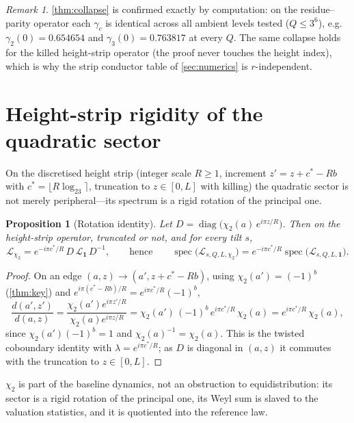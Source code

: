 \documentclass[11pt]{article}
\newcommand{\Lcal}{\mathcal{L}}
\theoremstyle{plain}
\newtheorem{proposition}{Proposition}
\theoremstyle{definition}
\theoremstyle{remark}
\newtheorem*{remark}{Remark}
\begin{document}
\begin{remark}
\cref{thm:collapse} is confirmed exactly by computation: on the residue--parity
operator each $\gamma_c$ is identical across all ambient levels tested
($Q\le3^6$), e.g.\ $\gamma_2(0)=0.654654$ and $\gamma_3(0)=0.763817$ at every
$Q$. The same collapse holds for the killed height-strip operator (the proof
never touches the height index), which is why the strip conductor table of
\cref{sec:numerics} is $r$-independent.
\end{remark}

\section{Height-strip rigidity of the quadratic sector}
\label{sec:strip}

On the discretised height strip (integer scale $R\ge1$, increment
$z'=z+c^\ast-Rb$ with $c^\ast=\lfloor R\log_23\rceil$, truncation to $z\in[0,L]$
with killing) the quadratic sector is not merely peripheral---its spectrum is a
rigid rotation of the principal one.

\begin{proposition}[Rotation identity]\label{prop:rot}
Let $D=\operatorname{diag}\bigl(\chi_2(a)\,e^{i\pi z/R}\bigr)$. Then on the
height-strip operator, truncated or not, and for every tilt $s$,
\[
\Lcal_{\chi_2}=e^{-i\pi c^\ast/R}\,D\,\Lcal_{\mathbf1}\,D^{-1},
\qquad\text{hence}\qquad
\operatorname{spec}\bigl(\Lcal_{s,Q,L,\chi_2}\bigr)
=e^{-i\pi c^\ast/R}\operatorname{spec}\bigl(\Lcal_{s,Q,L,\mathbf1}\bigr).
\]
\end{proposition}
\begin{proof}
On an edge $(a,z)\to(a',z+c^\ast-Rb)$, using $\chi_2(a')=(-1)^b$
(\cref{thm:key}) and $e^{i\pi(c^\ast-Rb)/R}=e^{i\pi c^\ast/R}(-1)^b$,
\[
\frac{d(a',z')}{d(a,z)}
=\frac{\chi_2(a')e^{i\pi z'/R}}{\chi_2(a)e^{i\pi z/R}}
=\chi_2(a')\,(-1)^b\,e^{i\pi c^\ast/R}\,\chi_2(a)
=e^{i\pi c^\ast/R}\,\chi_2(a),
\]
since $\chi_2(a')(-1)^b=1$ and $\chi_2(a)^{-1}=\chi_2(a)$. This is the twisted
coboundary identity with $\lambda=e^{i\pi c^\ast/R}$; as $D$ is diagonal in
$(a,z)$ it commutes with the truncation to $z\in[0,L]$.
\end{proof}

\begin{keystatement}
$\chi_2$ is part of the baseline dynamics, not an obstruction to
equidistribution: its sector is a rigid rotation of the principal one, its Weyl
sum is slaved to the valuation statistics, and it is quotiented into the
reference law.
\end{keystatement}
\end{document}
